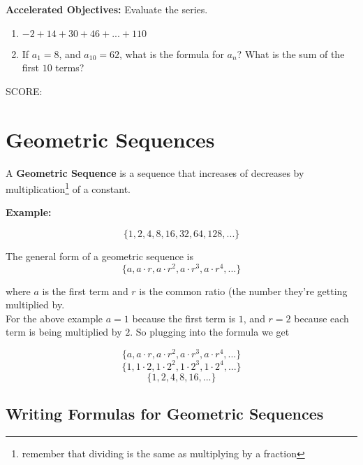 \documentclass[12pt]{article}
\begin{document}
\textbf{Accelerated Objectives:} Evaluate the series.

\begin{enumerate}[resume]
\setlength\itemsep{1.7cm}

	\item $-2+14+30+46+...+110$\\
	
	\item If $a_1=8$, and $a_{10}=62$, what is the formula for $a_n$? What is the sum of the first $10$ terms?

\end{enumerate}

\vfill SCORE:\underline{\hspace{1in}}



\pagebreak

\section{Geometric Sequences}

A \textbf{Geometric Sequence} is a sequence that increases of decreases by multiplication\footnote{remember that dividing is the same as multiplying by a fraction} of a constant.\\

\begin{addmargin}[4em]{1em}

\textbf{Example:}

$$\{1,2,4,8,16,32,64,128,...\}$$

\end{addmargin}

The general form of a geometric sequence is $$\{a,a\cdot r, a\cdot r^2, a\cdot r^3, a\cdot r^4,...\}$$

where $a$ is the first term and $r$ is the common ratio (the number they're getting multiplied by.\\

For the above example $a=1$ because the first term is $1$, and $r=2$ because each term is being multiplied by $2$. So plugging into the formula we get

$$\{a,a\cdot r, a\cdot r^2, a\cdot r^3, a\cdot r^4,...\}$$
$$\{1,1\cdot 2, 1\cdot 2^2, 1\cdot 2^3, 1\cdot 2^4,...\}$$
$$\{1,2,4,8,16,...\}$$

\subsection{Writing Formulas for Geometric Sequences}
\end{document}
